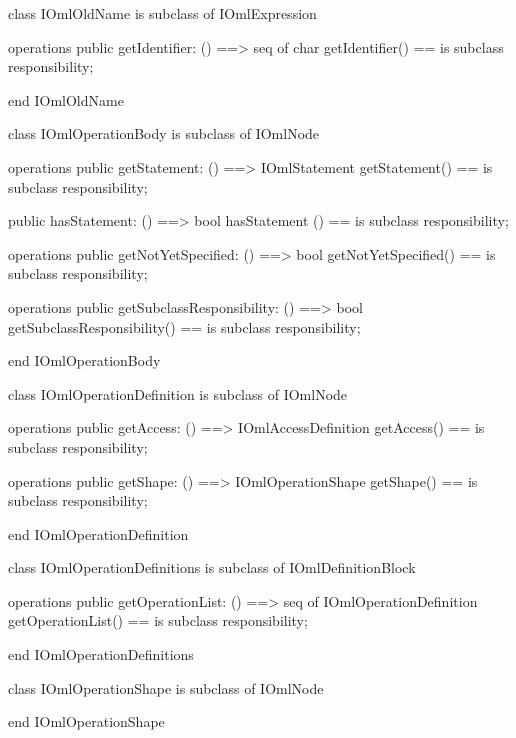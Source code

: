\begin{vdm_al}
class IOmlOldName
 is subclass of IOmlExpression

operations
  public getIdentifier: () ==> seq of char
  getIdentifier() == is subclass responsibility;

end IOmlOldName
\end{vdm_al}

\begin{vdm_al}
class IOmlOperationBody
 is subclass of IOmlNode

operations
  public getStatement: () ==> IOmlStatement
  getStatement() == is subclass responsibility;

  public hasStatement: () ==> bool
  hasStatement () == is subclass responsibility;

operations
  public getNotYetSpecified: () ==> bool
  getNotYetSpecified() == is subclass responsibility;

operations
  public getSubclassResponsibility: () ==> bool
  getSubclassResponsibility() == is subclass responsibility;

end IOmlOperationBody
\end{vdm_al}

\begin{vdm_al}
class IOmlOperationDefinition
 is subclass of IOmlNode

operations
  public getAccess: () ==> IOmlAccessDefinition
  getAccess() == is subclass responsibility;

operations
  public getShape: () ==> IOmlOperationShape
  getShape() == is subclass responsibility;

end IOmlOperationDefinition
\end{vdm_al}

\begin{vdm_al}
class IOmlOperationDefinitions
 is subclass of IOmlDefinitionBlock

operations
  public getOperationList: () ==> seq of IOmlOperationDefinition
  getOperationList() == is subclass responsibility;

end IOmlOperationDefinitions
\end{vdm_al}

\begin{vdm_al}
class IOmlOperationShape
 is subclass of IOmlNode

end IOmlOperationShape
\end{vdm_al}

